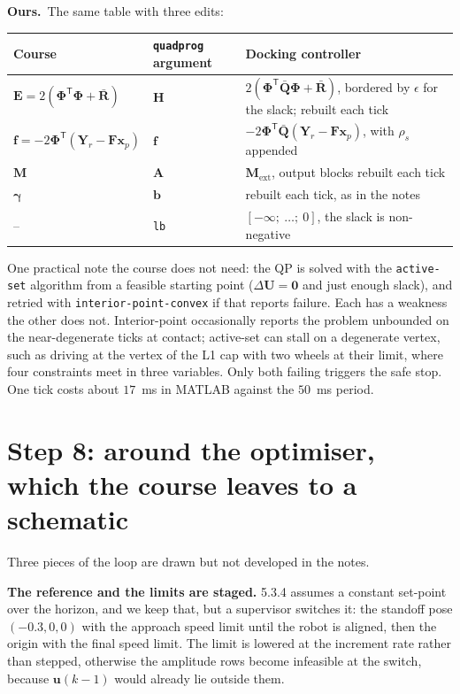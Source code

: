 \documentclass[11pt,a4paper]{article}
\newcommand{\vect}[1]{\bm{#1}}
\newcommand{\mat}[1]{\bm{#1}}
\newcommand{\T}{^{\mathsf{T}}}
\newcommand{\dU}{\Delta\vect{U}}
\newcommand{\Qbar}{\bar{\mat{Q}}}
\newcommand{\Rbar}{\bar{\mat{R}}}
\newcommand{\ours}{\textbf{\textcolor{green!45!black}{Ours.}}\ }
\begin{document}
\ours The same table with three edits:
\begin{center}
\small
\begin{tabularx}{\linewidth}{l l X}
\toprule
Course & \texttt{quadprog} argument & Docking controller \\
\midrule
$\mat E = 2(\mat\Phi\T\mat\Phi + \Rbar)$ & $\mat H$ & $2(\mat\Phi\T\Qbar\mat\Phi + \Rbar)$, bordered by $\epsilon$ for the slack; rebuilt each tick \\
$\vect f = -2\mat\Phi\T(\vect Y_r - \mat F\vect x_p)$ & $\vect f$ & $-2\mat\Phi\T\Qbar(\vect Y_r - \mat F\vect x_p)$, with $\rho_s$ appended \\
$\mat M$ & $\mat A$ & $\mat M_{\mathrm{ext}}$, output blocks rebuilt each tick \\
$\vect\gamma$ & $\vect b$ & rebuilt each tick, as in the notes \\
-- & \texttt{lb} & $[-\infty;\ \ldots;\ 0]$, the slack is non-negative \\
\bottomrule
\end{tabularx}
\end{center}
One practical note the course does not need: the QP is solved with the \texttt{active-set} algorithm from a feasible starting point ($\dU = \vect 0$ and just enough slack), and retried with \texttt{interior-point-convex} if that reports failure. Each has a weakness the other does not. Interior-point occasionally reports the problem unbounded on the near-degenerate ticks at contact; active-set can stall on a degenerate vertex, such as driving at the vertex of the L1 cap with two wheels at their limit, where four constraints meet in three variables. Only both failing triggers the safe stop. One tick costs about $17$~ms in MATLAB against the $50$~ms period.

\section{Step 8: around the optimiser, which the course leaves to a schematic}
Three pieces of the loop are drawn but not developed in the notes.

\textbf{The reference and the limits are staged.} 5.3.4 assumes a constant set-point over the horizon, and we keep that, but a supervisor switches it: the standoff pose $(-0.3, 0, 0)$ with the approach speed limit until the robot is aligned, then the origin with the final speed limit. The limit is lowered at the increment rate rather than stepped, otherwise the amplitude rows become infeasible at the switch, because $\vect u(k-1)$ would already lie outside them.
\end{document}
